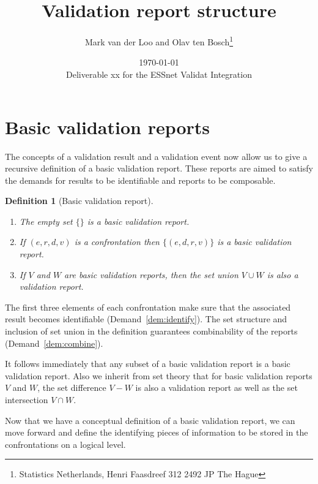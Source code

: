 \documentclass[a4paper, 11pt,titlepage]{article}
\title{Validation report structure}
\author{Mark van der Loo and Olav ten Bosch\thanks{
Statistics Netherlands, Henri Faasdreef 312 2492 JP The Hague
}}
\date{\today\\
\vspace{1cm}
Deliverable xx for the ESSnet Validat Integration
}
\newtheorem{definition}{Definition}
\begin{document}
\maketitle{}

\tableofcontents{}

\newpage






 
\section{Basic validation reports}
The concepts of a validation result and a validation event now allow us to give
a recursive definition of a basic validation report. These reports are aimed to
satisfy the demands for results to be identifiable and reports to be
composable.
%
\begin{definition}[Basic validation report]\leavevmode
\begin{enumerate}[topsep=0pt,itemsep=0pt]
\item The empty set $\{\}$ is a basic validation report.
\item If $(e,r,d,v)$ is a confrontation then $\{(e,d,r,v)\}$ is a basic
validation report.
\item If $V$ and $W$ are basic validation reports, then the set union $V\cup W$
is also a validation report.
\end{enumerate}
\label{def:basicvalidationreport}
\end{definition}
%
The first three elements of each confrontation make sure that the associated
result becomes identifiable (Demand~\ref{dem:identify}). The set structure and
inclusion of set union in the definition guarantees combinability of the
reports (Demand~\ref{dem:combine}).

It follows immediately that any subset of a basic validation report is a basic
validation report. Also we inherit from set theory that for basic validation
reports $V$ and $W$, the set difference $V-W$ is also a validation report as
well as the set intersection $V\cap W$.

Now that we have a conceptual definition of a basic validation report, we can
move forward and define the identifying pieces of information to be stored in
the confrontations on a logical level.


\end{document}
